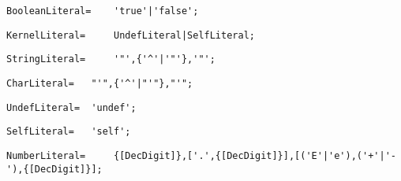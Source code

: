 \documentclass{article}
\begin{document}
    \begin{lstlisting}[mathescape=true]
     BooleanLiteral= 	'true'|'false';
    \end{lstlisting}
    
    \begin{lstlisting}[mathescape=true]
     KernelLiteral= 	UndefLiteral|SelfLiteral;
    \end{lstlisting}
    
    \begin{lstlisting}[mathescape=true]
     StringLiteral= 	'"',{'^'|'"'},'"';
    \end{lstlisting}
    
    \begin{lstlisting}[mathescape=true]
     CharLiteral= 	"'",{'^'|"'"},"'";
    \end{lstlisting}
    
    \begin{lstlisting}[mathescape=true]
     UndefLiteral= 	'undef';
    \end{lstlisting}
    
    \begin{lstlisting}[mathescape=true]
     SelfLiteral= 	'self';
    \end{lstlisting}
    
    \begin{lstlisting}[mathescape=true]
     NumberLiteral= 	{[DecDigit]},['.',{[DecDigit]}],[('E'|'e'),('+'|'-'),{[DecDigit]}];
    \end{lstlisting}
    
\end{document}
